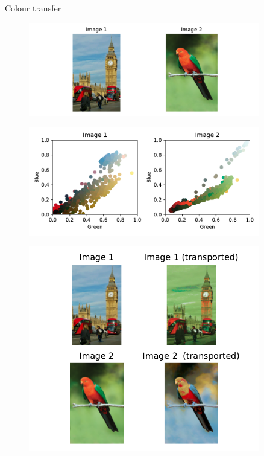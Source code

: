 \documentclass[pdf,aspectratio=169,10pt]{beamer}
\begin{document}
\begin{frame}{ Colour transfer}
\begin{minipage}{0.49\textwidth}
\vspace{1em}
    \begin{figure}
        \includegraphics[width=0.9\textwidth]{../img/ex1_original_images.pdf}
    \end{figure}

    \begin{figure}
        \includegraphics[width=0.9\textwidth]{../img/ex1_colour_histograms.pdf}
    \end{figure}
    
\end{minipage}
\hfill
\begin{minipage}{0.49\textwidth}
    \begin{figure}
        \includegraphics[width=0.9\textwidth]{../img/ex1_result.pdf}
    \end{figure}
\end{minipage}


\end{frame}
\end{document}
